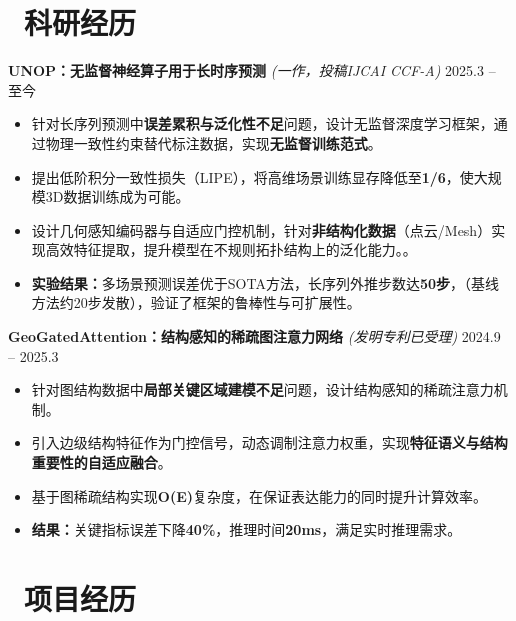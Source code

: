 \documentclass[11pt]{article}
\newlength{\interProjectSpacing}
\newcommand{\projectsep}{\vspace{\interProjectSpacing}}
\begin{document}
\section{\makebox[\widthof{\faUsers}][c]{\color{CVBlue}\faUsers}\ 
科研经历}

\textbf{UNOP：无监督神经算子用于长时序预测} 
\textit{(一作，投稿IJCAI CCF-A)} 
\hfill 2025.3 -- 至今
\begin{itemize}
    \item 针对长序列预测中\textbf{误差累积与泛化性不足}问题，设计无监督深度学习框架，通过物理一致性约束替代标注数据，实现\textbf{无监督训练范式}。
    
    \item 提出低阶积分一致性损失（LIPE），将高维场景训练显存降低至\textbf{1/6}，使大规模3D数据训练成为可能。
    
    \item 设计几何感知编码器与自适应门控机制，针对\textbf{非结构化数据}（点云/Mesh）实现高效特征提取，提升模型在不规则拓扑结构上的泛化能力。。
    
    \item \textbf{实验结果：}多场景预测误差优于SOTA方法，长序列外推步数达\textbf{50步}，（基线方法约20步发散），验证了框架的鲁棒性与可扩展性。
\end{itemize}


\textbf{GeoGatedAttention：结构感知的稀疏图注意力网络} 
\textit{(发明专利已受理)} \hfill 2024.9 -- 2025.3
\begin{itemize}
    \item 针对图结构数据中\textbf{局部关键区域建模不足}问题，设计结构感知的稀疏注意力机制。
    \item 引入边级结构特征作为门控信号，动态调制注意力权重，实现\textbf{特征语义与结构重要性的自适应融合}。
    \item 基于图稀疏结构实现\textbf{O(E)}复杂度，在保证表达能力的同时提升计算效率。
    \item \textbf{结果：}关键指标误差下降\textbf{40\%}，推理时间\textbf{20ms}，满足实时推理需求。
\end{itemize}

\section{\makebox[\widthof{\faBriefcase}][c]{\color{CVBlue}%
\faBriefcase}\ 项目经历}
\end{document}
